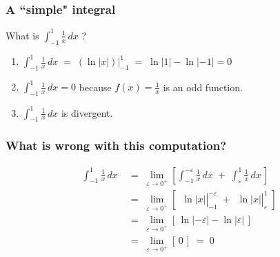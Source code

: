 \documentclass[14pt]{beamer}
\begin{document}
\begin{frame}[t]
	\frametitle{A ``simple" integral}

	What is $\displaystyle \int_{-1}^{1}\frac{1}{x}\, dx$ \; ?

	\begin{enumerate}
		\vfill

		\item $\displaystyle \int_{-1}^{1}\frac{1}{x}\, dx \; = \; \left( \ln |x| \right
			) \Big\vert_{-1}^{1}\; = \; \ln|1| - \ln|-1| = 0$
			\vfill

		\item $\displaystyle \int_{-1}^{1}\frac{1}{x}\, dx = 0$ \; because $\displaystyle
			f(x) = \frac{1}{x}$ is an odd function.
			\vfill

		\item $\displaystyle \int_{-1}^{1}\frac{1}{x}\, dx$ is divergent.
			\vfill
	\end{enumerate}
\end{frame}

\begin{frame}[t]
	\frametitle{What is wrong with this computation?}

	\[
		\begin{aligned}
			\int_{-1}^{1}\frac{1}{x}\, dx \; & = \; \lim_{\varepsilon \to 0^+}\left[ \int_{-1}^{-\varepsilon}\frac{1}{x}\, dx \; + \; \int_{\varepsilon}^{1}\frac{1}{x}\, dx \, \right]                                                \\
			\;                               & = \; \lim_{\varepsilon \to 0^+}\left[ \left. \phantom{\frac{1}{1}}\ln|x| \right\vert_{-1}^{-\varepsilon}\; + \left. \phantom{\frac{1}{1}}\ln|x| \right\vert_{\varepsilon}^{1}\; \right] \\
			\;                               & = \; \lim_{\varepsilon \to 0^+}\left[ \, \ln|-\varepsilon| - \ln |\varepsilon| \, \right] \phantom{\int}                                                                                \\
			\;                               & = \; \lim_{\varepsilon \to 0^+}\left[ \, 0 \, \right] \; = \; 0 \phantom{\int}
		\end{aligned}
	\]
\end{frame}
\end{document}
